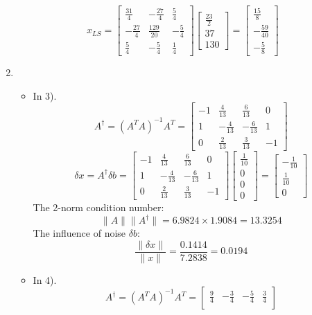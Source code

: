 \documentclass[english,onecolumn]{IEEEtran}
\begin{document}
\begin{enumerate}
    $$x_{LS}=\begin{bmatrix}
    \frac{31}{4} & -\frac{27}{4} & \frac{5}{4}\\
    -\frac{27}{4} & \frac{129}{20} & -\frac{5}{4}\\
    \frac{5}{4} & -\frac{5}{4} & \frac{1}{4}
    \end{bmatrix}\begin{bmatrix} \frac{23}{2} \\ 37\\ 130\end{bmatrix} =\begin{bmatrix}\frac{15}{8} \\ -\frac{59}{40}\\ -\frac{5}{8}\end{bmatrix}$$
    \item \begin{itemize}
    	\item In 3). 
    	$$A^{\dagger} = (A^TA)^{-1}A^T = \begin{bmatrix}
    		-1 & \frac{4}{13} & \frac{6}{13} & 0\\
    		1 & -\frac{4}{13} &-\frac{6}{13} & 1\\
    		0 & \frac{2}{13} & \frac{3}{13} & -1
    	\end{bmatrix}$$
    	$$\delta x = A^{\dagger}\delta b = \begin{bmatrix}
    		-1 & \frac{4}{13} & \frac{6}{13} & 0\\
    		1 & -\frac{4}{13} &-\frac{6}{13} & 1\\
    		0 & \frac{2}{13} & \frac{3}{13} & -1
    	\end{bmatrix}\begin{bmatrix} \frac{1}{10} \\ 0\\ 0\\ 0 \end{bmatrix}=\begin{bmatrix} -\frac{1}{10} \\ \frac{1}{10}\\ 0\end{bmatrix}$$
    	The 2-norm condition number:
    	$$\|A\|\|A^{\dagger}\| = 6.9824 \times 1.9084= 13.3254$$
    	The influence of noise $\delta b$:
    	$$\frac{\|\delta x\|}{\|x\|} = \frac{0.1414}{7.2838}=0.0194$$
    	\item In 4).
    	 $$A^{\dagger} = (A^TA)^{-1}A^T = \begin{bmatrix}
    		\frac{9}{4} & -\frac{3}{4} & -\frac{5}{4} & \frac{3}{4}\\

\end{bmatrix}$$
\end{itemize}
\end{enumerate}
\end{document}
